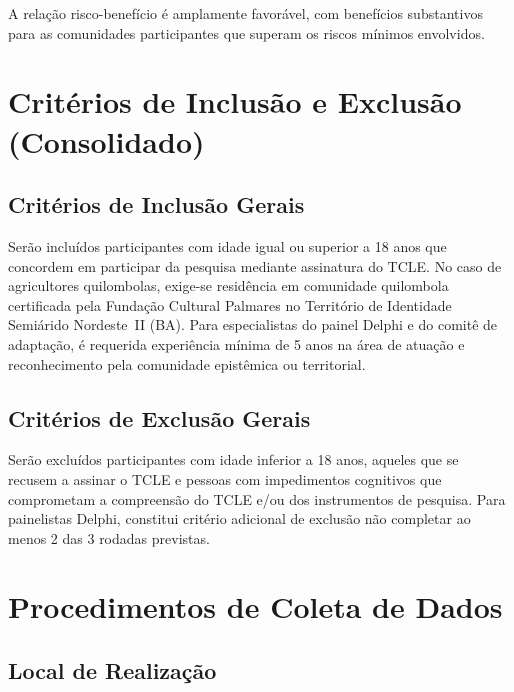 \documentclass[12pt,a4paper,brazil]{article}
\begin{document}
A relação risco-benefício é amplamente favorável, com benefícios substantivos para as comunidades participantes que superam os riscos mínimos envolvidos.


\section{Critérios de Inclusão e Exclusão (Consolidado)}

\subsection{Critérios de Inclusão Gerais}

Serão incluídos participantes com idade igual ou superior a 18 anos que concordem em participar da pesquisa mediante assinatura do TCLE. No caso de agricultores quilombolas, exige-se residência em comunidade quilombola certificada pela Fundação Cultural Palmares no Território de Identidade Semiárido Nordeste~II (BA). Para especialistas do painel Delphi e do comitê de adaptação, é requerida experiência mínima de 5 anos na área de atuação e reconhecimento pela comunidade epistêmica ou territorial.

\subsection{Critérios de Exclusão Gerais}

Serão excluídos participantes com idade inferior a 18 anos, aqueles que se recusem a assinar o TCLE e pessoas com impedimentos cognitivos que comprometam a compreensão do TCLE e/ou dos instrumentos de pesquisa. Para painelistas Delphi, constitui critério adicional de exclusão não completar ao menos 2 das 3 rodadas previstas.


\section{Procedimentos de Coleta de Dados}

\subsection{Local de Realização}
\end{document}
